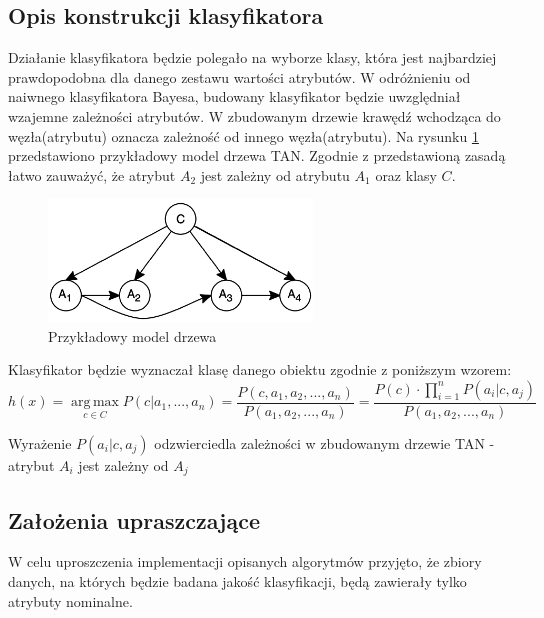 \documentclass[paper=a4, fontsize=11pt]{scrartcl} %
\numberwithin{equation}{section} %
\numberwithin{figure}{section} %
\numberwithin{table}{section} %
\begin{document}
\subsection{Opis konstrukcji klasyfikatora}
Działanie klasyfikatora będzie polegało na wyborze klasy, która jest najbardziej prawdopodobna dla danego zestawu wartości atrybutów. W odróżnieniu od  naiwnego klasyfikatora Bayesa, budowany klasyfikator będzie uwzględniał wzajemne zależności atrybutów. W zbudowanym drzewie krawędź wchodząca do węzła(atrybutu) oznacza zależność od innego węzła(atrybutu). Na rysunku \ref{fig:model_drzewa} przedstawiono przykładowy model drzewa TAN. Zgodnie z przedstawioną zasadą łatwo zauważyć, że atrybut $A_2$ jest zależny od atrybutu $A_1$ oraz klasy $C$.
\begin{figure}[h]
 \centering
 \includegraphics[width=70mm]{model1.png}
 \caption{Przykładowy model drzewa}
 \label{fig:model_drzewa}
\end{figure}

Klasyfikator będzie wyznaczał klasę danego obiektu zgodnie z poniższym wzorem:
\[h(x) = \operatorname*{arg\,max}_{c \in C} P(c|a_1,...,a_n)= \frac{P(c,a_1,a_2,...,a_n)}{P(a_1,a_2,...,a_n)}= 
\frac {P(c) \cdot \prod_{i=1}^{n} {P(a_i|c,a_j)}}{P(a_1,a_2,...,a_n)} \]

Wyrażenie $P(a_i|c,a_j)$ odzwierciedla zależności w zbudowanym drzewie TAN - atrybut $A_i$ jest zależny od $A_j$

\subsection{Założenia upraszczające}

W celu uproszczenia implementacji opisanych algorytmów przyjęto, że zbiory danych, na których będzie badana jakość klasyfikacji, będą zawierały tylko atrybuty nominalne.

    
\end{document}
